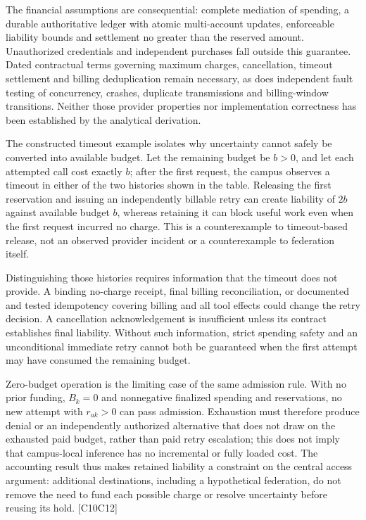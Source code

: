 \documentclass[11pt]{article}
\begin{document}
The financial assumptions are consequential: complete mediation of spending, a durable authoritative ledger with atomic multi-account updates, enforceable liability bounds and settlement no greater than the reserved amount. Unauthorized credentials and independent purchases fall outside this guarantee. Dated contractual terms governing maximum charges, cancellation, timeout settlement and billing deduplication remain necessary, as does independent fault testing of concurrency, crashes, duplicate transmissions and billing-window transitions. Neither those provider properties nor implementation correctness has been established by the analytical derivation.

The constructed timeout example isolates why uncertainty cannot safely be converted into available budget. Let the remaining budget be $b>0$, and let each attempted call cost exactly $b$; after the first request, the campus observes a timeout in either of the two histories shown in the table. Releasing the first reservation and issuing an independently billable retry can create liability of $2b$ against available budget $b$, whereas retaining it can block useful work even when the first request incurred no charge. This is a counterexample to timeout-based release, not an observed provider incident or a counterexample to federation itself.

Distinguishing those histories requires information that the timeout does not provide. A binding no-charge receipt, final billing reconciliation, or documented and tested idempotency covering billing and all tool effects could change the retry decision. A cancellation acknowledgement is insufficient unless its contract establishes final liability. Without such information, strict spending safety and an unconditional immediate retry cannot both be guaranteed when the first attempt may have consumed the remaining budget.

Zero-budget operation is the limiting case of the same admission rule. With no prior funding, $B_k=0$ and nonnegative finalized spending and reservations, no new attempt with $r_{ak}>0$ can pass admission. Exhaustion must therefore produce denial or an independently authorized alternative that does not draw on the exhausted paid budget, rather than paid retry escalation; this does not imply that campus-local inference has no incremental or fully loaded cost. The accounting result thus makes retained liability a constraint on the central access argument: additional destinations, including a hypothetical federation, do not remove the need to fund each possible charge or resolve uncertainty before reusing its hold. [C10\textendash{}\allowbreak{}C12]
\end{document}
